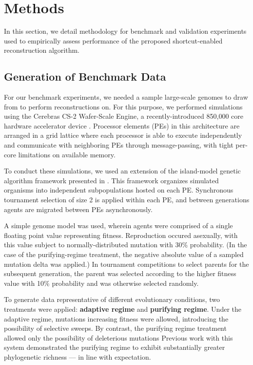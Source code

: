 \section{Methods} \label{sec:methods}

In this section, we detail methodology for benchmark and validation experiments used to empirically assess performance of the prroposed shortcut-enabled reconstruction algorithm.

\subsection{Generation of Benchmark Data}

For our benchmark experiments, we needed a sample large-scale genomes to draw from to perform reconstructions on.
For this purpose, we performed simulations using the Cerebras CS-2
Wafer-Scale Engine, a recently-introduced 850,000 core hardware accelerator device \citep{lie2023cerebras}.
Processor elements (PEs) in this architecture are arranged in a grid lattice where each processor is able to execute independently and communicate with neighboring PEs through message-passing, with tight per-core limitations on available memory.

To conduct these simulations, we used an extension of the island-model genetic algorithm framework presented in \citep{moreno2024trackable}.
This framework organizes simulated organisms into independent subpopulations hosted on each PE.
Synchronous tournament selection of size 2 is applied within each PE, and between generations agents are migrated between PEs asynchronously.


A simple genome model was used, wherein agents were comprised of a single floating point value representing fitness.
Reproduction occured asexually, with this value subject to normally-distributed mutation with 30\% probability.
(In the case of the purifying-regime treatment, the negative absolute value of a sampled mutation delta was applied.)
In tournament competitions to select parents for the subsequent generation, the parent was selected according to the higher fitness value with 10\% probability and was otherwise selected randomly.

To generate data representative of different evolutionary conditions, two treatments were applied:
\textbf{adaptive regime} and \textbf{purifying regime}.
Under the adaptive regime, mutations increasing fitness were allowed, introducing the possibility of selective sweeps.
By contrast, the purifying regime treatment allowed only the possibility of deleterious mutations
Previous work with this system demonstrated the purifying regime to exhibit substantially greater phylogenetic richness --- in line with expectation.

